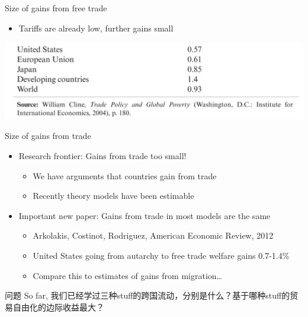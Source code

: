 \documentclass[10pt,hyperref={CJKbookmarks=true},xcolor=dvipsnames,aspectratio=169]{beamer}
\begin{document}
\begin{frame}{Size of gains from free trade}
\begin{itemize}
\item Tariffs are already low, further gains small
\end{itemize}
\includegraphics[scale=0.25]{fig/politic/trade_gains.png}
\end{frame}

\begin{frame}{Size of gains from trade}
\begin{itemize}
\item Research frontier: Gains from trade too small!
\begin{itemize}
\item We have arguments that countries gain from trade
\item Recently theory models have been estimable
\end{itemize}
\item Important new paper: Gains from trade in most models are the same
\begin{itemize}
\item Arkolakis, Costinot, Rodriguez, American Economic Review, 2012
\item United States going from autarchy to free trade welfare gains 0.7-1.4\% 
\item Compare this to estimates of gains from migration\dots
\end{itemize}
\end{itemize}

	\begin{block}{问题}
		So far, 我们已经学过三种stuff的跨国流动，分别是什么？基于哪种stuff的贸易自由化的边际收益最大？
	\end{block}
\end{frame}
\end{document}
